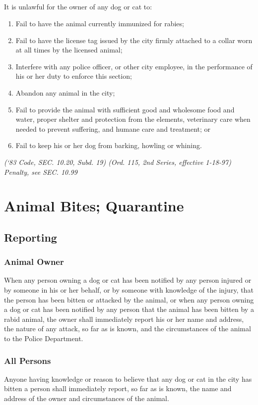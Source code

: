 \subsection{}
It is unlawful for the owner of any dog or cat to:
\begin{enumerate}[{\indent}1)]
    \item Fail to have the animal currently immunized for rabies;
    \item Fail to have the license tag issued by the city firmly attached to a collar worn at all times by the licensed animal;
    \item Interfere with any police officer, or other city employee, in the performance of his or her duty to enforce this section;
    \item Abandon any animal in the city;
    \item Fail to provide the animal with sufficient good and wholesome food and water, proper shelter and protection from the elements, veterinary care when needed to prevent suffering, and humane care and treatment; or 
    \item Fail to keep his or her dog from barking, howling or whining.
\end{enumerate}
\emph{(‘83 Code, SEC. 10.20, Subd. 19)  (Ord. 115, 2nd Series, effective 1-18-97)  Penalty, see SEC. 10.99}

\section{Animal Bites; Quarantine}
\subsection{Reporting}
\subsubsection{Animal Owner}
When any person owning a dog or cat has been notified by any person injured or by someone in his or her behalf, or by someone with knowledge of the injury, that the person has been bitten or attacked by the animal, or when any person owning a dog or cat has been notified by any person that the animal has been bitten by a rabid animal, the owner shall immediately report his or her name and address, the nature of any attack, so far as is known, and the circumstances of the animal to the Police Department.
\subsubsection{All Persons}
Anyone having knowledge or reason to believe that any dog or cat in the city has bitten a person shall immediately report, so far as is known, the name and address of the owner and circumstances of the animal.
